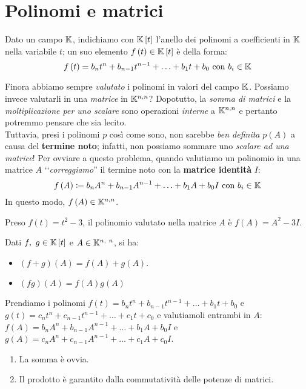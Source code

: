 \section{Polinomi e matrici}
\begin{remember}
	Dato un campo $\mathbb{K}$, indichiamo con $\mathbb{K}\left[t\right]$ l'anello dei polinomi a coefficienti in $\mathbb{K}$ nella variabile $t$; un suo elemento $f\left(t\right)\in\mathbb{K}\left[t\right]$ è della forma:
	\begin{equation}
		f\left(t\right)=b_nt^n+b_{n-1}t^{n-1}+\ldots+b_1t+b_0\text{ con }b_i\in\mathbb{K}
	\end{equation}
\vspace{-6mm}
\end{remember}
Finora abbiamo sempre \textit{valutato} i polinomi in valori del campo $\mathbb{K}$. Possiamo invece valutarli in una \textit{matrice} in $\mathbb{K}^{n, n}$? Dopotutto, la \textit{somma di matrici} e la \textit{moltiplicazione per uno scalare} sono operazioni \textit{interne} a $\mathbb{K}^{n, n}$ e pertanto potremmo pensare che sia lecito.\\ Tuttavia, presi i polinomi $p$ così come sono, non sarebbe \textit{ben definita} $p\left(A\right)$ a causa del \textbf{termine noto}; infatti, non possiamo sommare uno \textit{scalare ad una matrice}! Per ovviare a questo problema, quando valutiamo un polinomio in una matrice $A$ ‘‘\textit{correggiamo}'' il termine noto con la \textbf{matrice identità} $I$:
\begin{equation}
	f\left(A\right)\coloneqq b_nA^n+b_{n-1}A^{n-1}+\ldots+b_1A+b_0I\text{ con }b_i\in\mathbb{K}
\end{equation}
In questo modo, $f\left(A\right)\in\mathbb{K}^{n, n}$.
\begin{example}
Preso $f\left(t\right)=t^2-3$, il polinomio valutato nella matrice $A$ è $f\left(A\right)=A^2-3I$.
\end{example}
\begin{observe}
	Dati $f,\ g\in\mathbb{K}\left[t\right]$ e $A\in\mathbb{K}^{n,\ n}$, si ha:
	\begin{itemize}
		\item $\left(f+g\right)\left(A\right)=f\left(A\right)+g\left(A\right)$.
		\item $\left(fg\right)\left(A\right)=f\left(A\right)g\left(A\right)$
	\end{itemize}
\vspace{-3mm}
\end{observe}
\begin{demonstration}
	Prendiamo i polinomi $f\left(t\right)=b_nt^n+b_{n-1}t^{n-1}+\ldots+b_1t+b_0$ e $g\left(t\right)=c_nt^n+c_{n-1}t^{n-1}+\ldots+c_1t+c_0$ e valutiamoli entrambi in $A$: $f\left(A\right)=b_nA^n+b_{n-1}A^{n-1}+\ldots+b_1A+b_0I$ e $g\left(A\right)=c_nA^n+c_{n-1}A^{n-1}+\ldots+c_1A+c_0I$.
	\begin{enumerate}[label=\Roman*]
		\item La somma è ovvia.
		\item Il prodotto è garantito dalla commutatività delle potenze di matrici.
	\end{enumerate}
\vspace{-3mm}
\end{demonstration}
